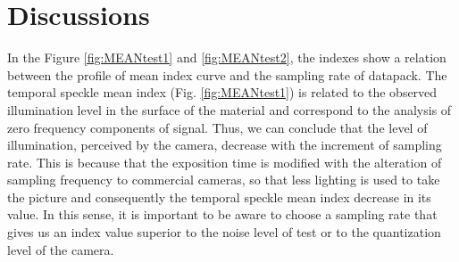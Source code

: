 \documentclass[review]{elsarticle}
\begin{document}
\section{Discussions} 
\label{sec:analysisresults}


In the Figure \ref{fig:MEANtest1} and \ref{fig:MEANtest2}, 
the indexes show a relation between the profile of mean index curve and the sampling rate of datapack. 
The temporal speckle mean index (Fig. \ref{fig:MEANtest1}) is related to 
the observed illumination level in the surface of the material \cite{Nothdurft:05} and  
correspond to the analysis of zero frequency components of signal.
Thus, we can conclude that the level of illumination, perceived by the camera, 
decrease with the increment of sampling rate. 
This is because that the exposition time is modified with the alteration of sampling frequency to commercial cameras, 
so that less lighting is used to take the picture and consequently the 
temporal speckle mean index decrease in  its value.
In this sense, it is important to be aware to choose a sampling rate
that gives us an index value superior to the noise level of test or to the quantization level of the camera.
\end{document}
